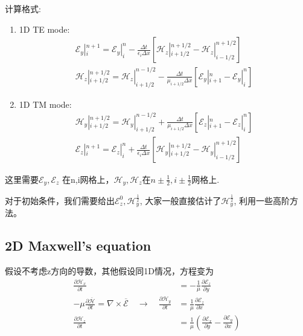 \documentclass{article}
\newcommand{\nobracket}{}
\begin{document}
\begin{CJK*}{UTF8}{gbsn}
计算格式:
\begin{enumerate}
  \item 1D TE mode:
  \[ \begin{array}{c}
       \nobracket \mathscr{E}_y |_i^{n + 1} = \nobracket \mathscr{E}_y |_i^n -
       \frac{\Delta t}{\epsilon_i \Delta x}  [\nobracket \mathscr{H}_z |_{i +
       1 / 2}^{n + 1 / 2} - \nobracket \mathscr{H}_z |_{i - 1 / 2}^{n + 1 /
       2}]\\
       \nobracket \mathscr{H}_z |_{i + 1 / 2}^{n + 1 / 2} = \nobracket
       \mathscr{H}_z |_{i + 1 / 2}^{n - 1 / 2} - \frac{\Delta t}{\mu_{i + 1 /
       2} \Delta x}  [\nobracket \mathscr{E}_y |_{i + 1}^n - \nobracket
       \mathscr{E}_y |_i^n]
     \end{array} \]
  \item 1D TM mode:
  \[ \begin{array}{c}
       \nobracket \mathscr{H}_y |_{i + 1 / 2}^{n + 1 / 2} = \nobracket
       \mathscr{H}_y |_{i + 1 / 2}^{n - 1 / 2} + \frac{\Delta t}{\mu_{i + 1 /
       2} \Delta x}  [\nobracket \mathscr{E}_z |_{i + 1}^n - \nobracket
       \mathscr{E}_z |_i^n]\\
       \nobracket \mathscr{E}_z |_i^{n + 1} = \nobracket \mathscr{E}_z |_i^n +
       \frac{\Delta t}{\epsilon_i \Delta x}  [\nobracket \mathscr{H}_y |_{i +
       1 / 2}^{n + 1 / 2} - \nobracket \mathscr{H}_y |_{i - 1 / 2}^{n + 1 /
       2}]
     \end{array} \]
\end{enumerate}
这里需要$\mathscr{E}_y, \mathscr{E}_z$ 在n,i网格上，$\mathscr{H}_y,
\mathscr{H}_z$在$n \pm \frac{1}{2}, i \pm \frac{1}{2}$网格上.

对于初始条件，我们需要给出$\mathscr{E}_z^0,
\mathscr{H}_y^{\frac{1}{2}}$,
大家一般直接估计了$\mathscr{H}_y^{\frac{1}{2}}$,
利用一些高阶方法。

\subsection{2D Maxwell's equation}

假设不考虑z方向的导数，其他假设同1D情况，方程变为
\[ \begin{aligned}
     \frac{\partial \mathscr{H}_x}{\partial t} & = - \frac{1}{\mu} 
     \frac{\partial \mathscr{E}_z}{\partial y}\\
     - \mu \frac{\partial \overline{\mathscr{H}}}{\partial t} = \nabla \times
     \overline{\mathscr{E}} \quad \rightarrow \quad \frac{\partial
     \mathcal{H}_y}{\partial t} & = \frac{1}{\mu}  \frac{\partial
     \mathscr{E}_z}{\partial x}\\
     \frac{\partial \mathscr{H}_z}{\partial t} & = \frac{1}{\mu}  \left(
     \frac{\partial \mathscr{E}_x}{\partial y} - \frac{\partial
     \mathscr{E}_y}{\partial x} \right)
   \end{aligned} \]
\[ \
   
\]
\end{CJK*}
\end{document}
